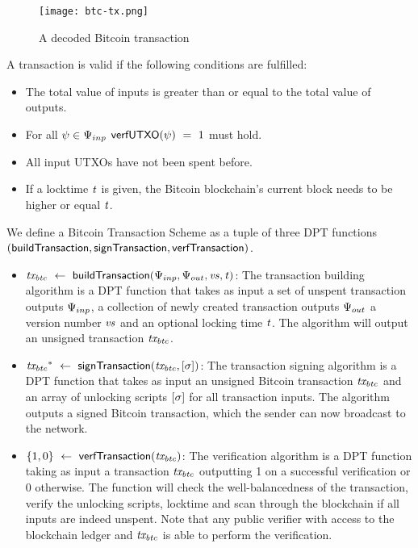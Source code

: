\begin{figure}
    \begin{center}
        \texttt{[image: btc-tx.png]}
    \end{center}
    \caption{A decoded Bitcoin transaction} \label{fig:btc-tx}
\end{figure}

A transaction is valid if the following conditions are fulfilled:

\begin{itemize}
    \item The total value of inputs is greater than or equal to the total value of outputs.
    \item For all $\psi \in \Psi_{inp}$ $\mathsf{verfUTXO}(\psi) ~=~ 1$ must hold.
    \item All input UTXOs have not been spent before.
    \item If a locktime $\mathit{t}$ is given, the Bitcoin blockchain's current block needs to be higher or equal $\mathit{t}$.
\end{itemize}

\begin{definition}
    We define a Bitcoin Transaction Scheme as a tuple of three DPT functions $(\mathsf{buildTransaction},
    \mathsf{signTransaction}, \mathsf{verfTransaction})$.
    \begin{itemize}
        \item $\mathit{tx_{btc}} ~\leftarrow~ \mathsf{buildTransaction}(\Psi_{inp},\Psi_{out},\mathit{vs},\mathit{t})$: The transaction building algorithm is a DPT function that takes as input a set of unspent transaction outputs $\Psi_{inp}$, a collection of newly created transaction outputs $\Psi_{out}$ a version number $\mathit{vs}$ and an optional locking time $\mathit{t}$.
        The algorithm will output an unsigned transaction $\mathit{tx_{btc}}$.
        \item $\mathit{tx_{btc}}^* ~\leftarrow~ \mathsf{signTransaction} (\mathit{tx_{btc}},[\mathit{\sigma}])$: The transaction
        signing algorithm is a DPT function that takes as input an unsigned Bitcoin transaction $\mathit{tx_{btc}}$ and an array
        of unlocking scripts $[\mathit{\sigma}]$ for all transaction inputs.
        The algorithm outputs a signed Bitcoin transaction, which the sender can now broadcast to the network.
        \item $\{ 1,0 \} ~\leftarrow~ \mathsf{verfTransaction}(\mathit{tx_{btc}})$: The verification algorithm is a DPT function taking as input a transaction $\mathit{tx_{btc}}$ outputting 1 on a successful verification or 0 otherwise.
        The function will check the well-balancedness of the transaction, verify the unlocking scripts, locktime and scan through the blockchain if all inputs are indeed unspent.
        Note that any public verifier with access to the blockchain ledger and $\mathit{tx_{btc}}$ is able to perform the verification.
    \end{itemize}
\end{definition}


